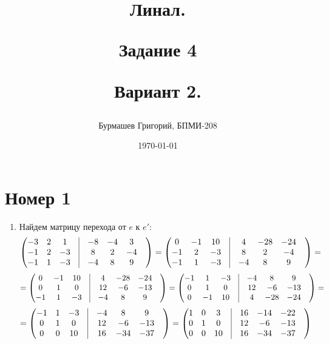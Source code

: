 \documentclass[a4paper,12pt]{article}
\author{Бурмашев Григорий, БПМИ-208}
\title{Линал. 

Задание 4

Вариант 2.}
\date{\today}
\begin{document}
\maketitle
\newpage
\section*{Номер 1}
\begin{enumerate}
\item Найдем матрицу перехода от  $e$ к  $e'$:
\[
\begin{pmatrix}
-3 & 2 & 1 & \vrule&-8 & -4 & 3 & \\
-1 & 2 & -3 & \vrule &8 & 2 & -4 & \\
-1 & 1 & -3 &  \vrule& -4 & 8 & 9 & \\
\end{pmatrix}
=
\begin{pmatrix}
0 & -1 & 10 &\vrule& 4 & -28 & -24 & \\
-1 & 2 & -3 &\vrule& 8 & 2 & -4 & \\
-1 & 1 & -3 &\vrule& -4 & 8 & 9 & \\
\end{pmatrix}
=
\]
\[
=
\begin{pmatrix}
0 & -1 & 10 & \vrule&4 & -28 & -24 & \\
0 & 1 & 0 & \vrule&12 & -6 & -13 & \\
-1 & 1 & -3 &\vrule& -4 & 8 & 9 & \\
\end{pmatrix}
=
\begin{pmatrix}
-1 & 1 & -3 & \vrule&-4 & 8 & 9 & \\
0 & 1 & 0 & \vrule&12 & -6 & -13 & \\
0 & -1 & 10 &\vrule& 4 & -28 & -24 & \\
\end{pmatrix}
=
\]
\[
=
\begin{pmatrix}
-1 & 1 & -3 &\vrule& -4 & 8 & 9 & \\
0 & 1 & 0 &\vrule& 12 & -6 & -13 & \\
0 & 0 & 10 &\vrule& 16 & -34 & -37 & \\
\end{pmatrix}
=
\begin{pmatrix}
1 & 0 & 3 &\vrule& 16 & -14 & -22 & \\
0 & 1 & 0 & \vrule&12 & -6 & -13 & \\
0 & 0 & 10 &\vrule& 16 & -34 & -37 & \\
\end{pmatrix}
\]
\end{enumerate}
\end{document}
